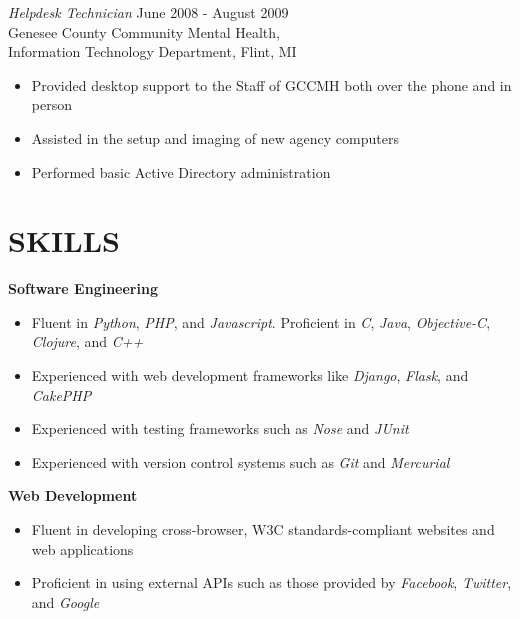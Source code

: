 \documentclass[line,margin]{res}
\begin{document}
\begin{resume}
                {\sl Helpdesk Technician} \hfill June 2008 - August 2009 \\
                Genesee County Community Mental Health, \\
                Information Technology Department, Flint, MI
                \vspace{2 mm}
                  \begin{itemize}
                       \item Provided desktop support to the Staff of GCCMH both
                            over the phone and in person
                        \item Assisted in the setup and imaging of new agency
                            computers
                        \item Performed basic Active Directory administration
                   \end{itemize}

\section{SKILLS}
\textbf{Software Engineering}
\vspace{2 mm}
\begin{itemize}
    \item Fluent in {\sl Python}, {\sl PHP}, and {\sl Javascript}. Proficient
            in {\sl C}, {\sl Java}, {\sl Objective-C}, {\sl Clojure}, and {\sl C++}
    \item Experienced with web development frameworks like {\sl Django},
            {\sl Flask}, and {\sl CakePHP}
    \item Experienced with testing frameworks such as {\sl Nose} and {\sl JUnit}
    \item Experienced with version control systems such as {\sl Git} and {\sl Mercurial}
\end{itemize}

\textbf{Web Development}
\vspace{2 mm}
\begin{itemize}
    \item Fluent in developing cross-browser, W3C standards-compliant websites
            and web applications
    \item Proficient in using external APIs such as those provided by {\sl Facebook},
            {\sl Twitter}, and {\sl Google}
\end{itemize}


\end{resume}
\end{document}
